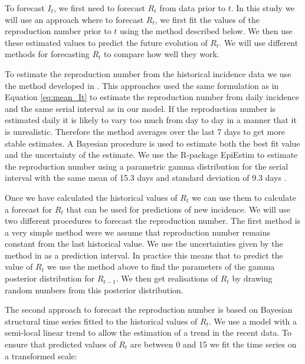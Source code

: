 \documentclass[12pt]{article}
\begin{document}

To forecast $I_t$, we first need to forecast $R_t$ from data prior to $t$. In this study we will use an approach where to forecast $R_t$, we first fit the values of the reproduction number prior to $t$ using the method described below. We then use these estimated values to predict the future evolution of $R_t$. We will use different methods for forecasting $R_t$ to compare how well they work. 

To estimate the reproduction number from the historical incidence data we use the method developed in \cite{coriNewFrameworkSoftware2013,thompsonImprovedInferenceTimevarying2019}. This approaches used the same formulation as in Equation \ref{eq:mean_It} to estimate the reproduction number from daily incidence and the same serial interval as in our model. If the reproduction number is estimated daily it is likely to vary too much from day to day in a manner that it is unrealistic. Therefore the method averages over the last 7 days to get more stable estimates. A Bayesian procedure is used to estimate both the best fit value and the uncertainty of the estimate. We use the R-package EpiEstim \cite{coriEpiEstimEpiEstimPackage2013} to estimate the reproduction number using a parametric gamma distribution for the serial interval with the same mean of 15.3 days and standard deviation of 9.3 days \cite{whoebolaresponseteamEbolaVirusDisease2014}.

Once we have calculated the historical values of $R_t$ we can use them to calculate a forecast for $R_t$ that can be used for predictions of new incidence. We will use two different procedures to forecast the reproduction number. The first method is a very simple method were we assume that reproduction number remains constant from the last historical value. We use the uncertainties given by the method in \cite{coriNewFrameworkSoftware2013} as a prediction interval. In practice this means that to predict the value of $R_t$ we use the method above to find the parameters of the gamma posterior distribution for $R_{t-1}$. We then get realisations of $R_t$ by drawing random numbers from this posterior distribution. 

The second approach to forecast the reproduction number is based on Bayesian structural time series fitted to the historical values of $R_t$. We use a model with a semi-local linear trend to allow the estimation of a trend in the recent data. To ensure that predicted values of $R_t$ are between 0 and 15 we fit the time series on a transformed scale:
\end{document}

